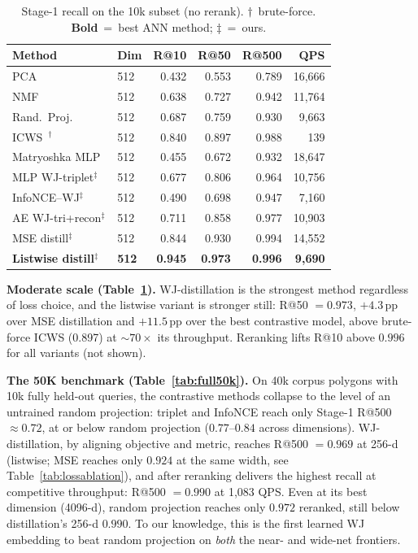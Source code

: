 \documentclass[conference]{IEEEtran}
\begin{document}
\begin{table}[t]\centering
\caption{Stage-1 recall on the 10k subset (no rerank). $\dagger$~brute-force.
\textbf{Bold}~=~best ANN method; $\ddagger$~=~ours.}
\label{tab:results}\setlength{\tabcolsep}{4pt}\small
\begin{tabular}{@{}llrrrr@{}}
\toprule
Method & Dim & R@10 & R@50 & R@500 & QPS \\
\midrule
PCA~\cite{jolliffe02}                   & 512  & 0.432 & 0.553 & 0.789 & 16{,}666 \\
NMF~\cite{nmf99}                        & 512  & 0.638 & 0.727 & 0.942 & 11{,}764 \\
Rand.\ Proj.~\cite{achlioptas03}        & 512  & 0.687 & 0.759 & 0.930 &  9{,}663 \\
ICWS~\cite{ioffe10}$^\dagger$           & 512  & 0.840 & 0.897 & 0.988 &     139 \\
Matryoshka MLP~\cite{matryoshka22}      & 512  & 0.455 & 0.672 & 0.932 & 18{,}647 \\
\addlinespace[2pt]
MLP WJ-triplet$^\ddagger$               & 512  & 0.677 & 0.806 & 0.964 & 10{,}756 \\
InfoNCE--WJ$^\ddagger$                  & 512  & 0.490 & 0.698 & 0.947 &  7{,}160 \\
AE WJ-tri+recon$^\ddagger$              & 512  & 0.711 & 0.858 & 0.977 & 10{,}903 \\
MSE distill$^\ddagger$        & 512  & 0.844 & 0.930 & 0.994 & 14{,}552 \\
\textbf{Listwise distill}$^\ddagger$ & \textbf{512} & \textbf{0.945} & \textbf{0.973} & \textbf{0.996} & \textbf{9{,}690} \\
\bottomrule
\end{tabular}
\end{table}

\textbf{Moderate scale (Table~\ref{tab:results}).}
WJ-distillation is the strongest method regardless of loss choice, and the listwise
variant is stronger still: R@50 $=0.973$, $+4.3$\,pp over MSE distillation and
$+11.5$\,pp over the best contrastive model, above brute-force ICWS (0.897) at
${\sim}70\times$ its throughput. Reranking lifts R@10 above $0.996$ for all
variants (not shown).

\textbf{The 50K benchmark (Table~\ref{tab:full50k}).}
On 40k corpus polygons with 10k fully held-out queries, the contrastive methods
collapse to the level of an untrained random projection: triplet and InfoNCE reach
only Stage-1 R@500 $\approx 0.72$, at or below random projection ($0.77$--$0.84$
across dimensions). WJ-distillation, by aligning objective and metric, reaches
R@500 $=0.969$ at 256-d (listwise; MSE reaches only $0.924$ at the same width, see
Table~\ref{tab:lossablation}), and after reranking delivers the highest recall at
competitive throughput: R@500 $=0.990$ at 1{,}083 QPS. Even at its best dimension
(4096-d), random projection reaches only $0.972$ reranked, still below
distillation's 256-d $0.990$. To our knowledge,
this is the first learned WJ embedding to beat random projection on \emph{both} the
near- and wide-net frontiers.
\end{document}
